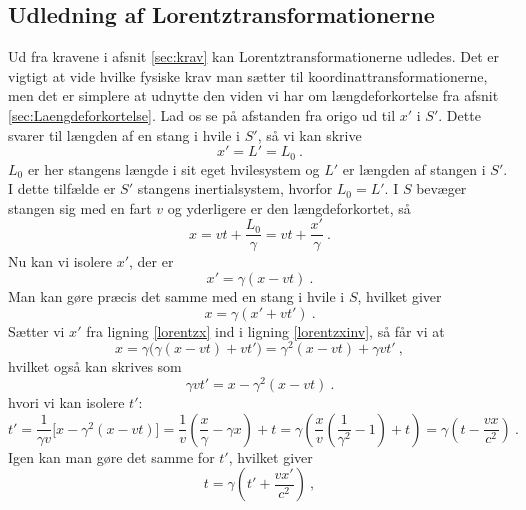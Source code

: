 \subsection{Udledning af Lorentztransformationerne}
Ud fra kravene i afsnit \ref{sec:krav} kan Lorentztransformationerne udledes. Det er vigtigt at vide hvilke fysiske krav man sætter til koordinattransformationerne, men det er simplere at udnytte den viden vi har om længdeforkortelse fra afsnit \ref{sec:Laengdeforkortelse}. Lad os se på afstanden fra origo ud til $x'$ i $S'$.
Dette svarer til længden af en stang i hvile i $S'$, så vi kan skrive
\begin{equation}
    x'=L'=L_0 \: .
\end{equation}
$L_0$ er her stangens længde i sit eget hvilesystem og $L'$ er længden af stangen i $S'$. I dette tilfælde er $S'$ stangens inertialsystem, hvorfor $L_0 = L'$.
I $S$ bevæger stangen sig med en fart $v$ og yderligere er den længdeforkortet, så
\begin{equation}
    x=vt+\frac{L_0}{\gamma} = vt+\frac{x'}{\gamma} \: .
\end{equation}
Nu kan vi isolere $x'$, der er
\begin{equation}
    x'=\gamma(x-vt) \: . \label{lorentzx}
\end{equation}
Man kan gøre præcis det samme med en stang i hvile i $S$, hvilket giver
\begin{equation}
    x=\gamma(x'+vt') \: .\label{lorentzxinv}
\end{equation}
Sætter vi $x'$ fra ligning \eqref{lorentzx} ind i ligning \eqref{lorentzxinv}, så får vi at
\begin{equation}
    x=\gamma\Big(\gamma(x-vt)+vt'\Big) = \gamma^2(x-vt) + \gamma vt' \: ,
\end{equation}
hvilket også kan skrives som
\begin{equation}
    \gamma vt' = x - \gamma^2(x-vt) \: .
\end{equation}
hvori vi kan isolere $t'$:
\begin{equation}
    t' = \frac{1}{\gamma v}\Big[x - \gamma^2(x-vt)\Big] = \frac{1}{v}\left(\frac{x}{\gamma}-\gamma x\right) + t = \gamma \left(\frac{x}{v}\left(\frac{1}{\gamma^2}-1\right)+t\right)=\gamma\left(t-\frac{vx}{c^2}\right) \: .
\end{equation}
Igen kan man gøre det samme for $t'$, hvilket giver
\begin{equation}
    t=\gamma\left(t'+\frac{vx'}{c^2}\right) \: ,
\end{equation}
